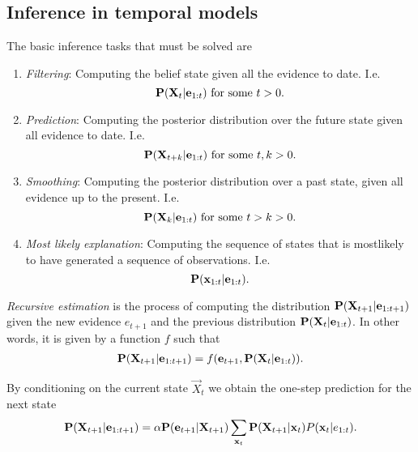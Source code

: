 \documentclass{article}
\begin{document}
\subsection{Inference in temporal models}

\begin{proposition}[R\&N p. 570]
    The basic inference tasks that must be solved are
    \begin{enumerate}
        \item \emph{Filtering}: Computing the belief state given all the evidence to date.
              I.e. \[\P(\vec X_t | \vec e_{1:t}) \text{ for some } t>0.\]
        \item \emph{Prediction}: Computing the posterior distribution over the future
              state given all evidence to date. I.e. \[\P(\vec X_{t+k}|\vec e_{1:t})\text{ for some }t,k>0.\]
        \item \emph{Smoothing}: Computing the posterior distribution over a past state, given all evidence
              up to the present. I.e. \[\P(\vec X_k | \vec e_{1:t}) \text{ for some } t>k>0.\]
        \item \emph{Most likely explanation}: Computing the sequence of states that is mostlikely to have
              generated a sequence of observations. I.e. \[\P(\vec x_{1:t}|\vec e_{1:t}).\]
    \end{enumerate}
\end{proposition}


\begin{definition}
    \emph{Recursive estimation} is the process of computing the distribution $\P(\vec X_{t+1}|\vec e_{1:t+1})$
    given the new evidence $e_{t+1}$ and the previous distribution $\P(\vec X_t|\vec e_{1:t})$. In other words,
    it is given by a function $f$ such that
    \begin{align*}
        \P(\vec X_{t+1}|\vec e_{1:t+1})=f(\vec e_{t+1}, \P(\vec X_t|\vec e_{1:t})).
    \end{align*}
\end{definition}

\begin{theorem}[R\&N p. 572]
    By conditioning on the current state $\vec X_t$ we obtain the one-step prediction for the
    next state
    \begin{align*}
        \P(\vec X_{t+1}|\vec e_{1:t+1}) = \alpha \P(\vec e_{t+1}|\vec X_{t+1})\sum_{\vec x_t} \P(\vec X_{t+1}|\vec x_t)P(\vec x_t|e_{1:t}).
    \end{align*}
\end{theorem}
\end{document}
